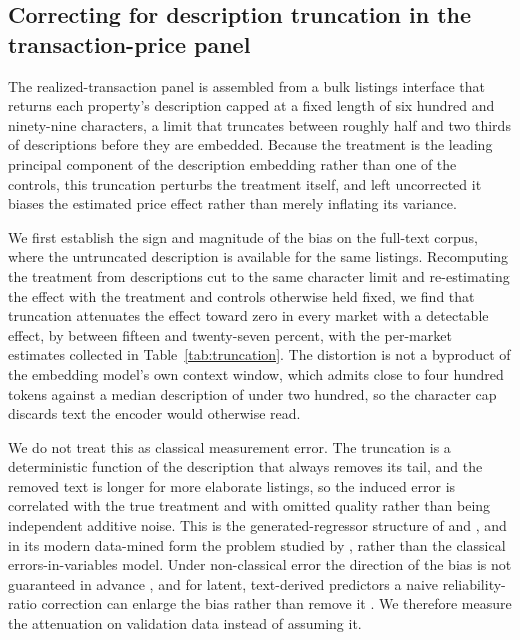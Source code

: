 \subsection{Correcting for description truncation in the transaction-price panel}
\label{sec:truncation}

The realized-transaction panel is assembled from a bulk listings interface that
returns each property's description capped at a fixed length of six hundred and
ninety-nine characters, a limit that truncates between roughly half and two thirds
of descriptions before they are embedded. Because the treatment is the leading
principal component of the description embedding rather than one of the controls,
this truncation perturbs the treatment itself, and left uncorrected it biases the
estimated price effect rather than merely inflating its variance.

We first establish the sign and magnitude of the bias on the full-text corpus,
where the untruncated description is available for the same listings. Recomputing
the treatment from descriptions cut to the same character limit and re-estimating
the effect with the treatment and controls otherwise held fixed, we find that
truncation attenuates the effect toward zero in every market with a detectable
effect, by between fifteen and twenty-seven percent, with the per-market estimates
collected in Table~\ref{tab:truncation}. The distortion is not a byproduct of the
embedding model's own context window, which admits close to four hundred tokens
against a median description of under two hundred, so the character cap discards
text the encoder would otherwise read.

We do not treat this as classical measurement error. The truncation is a
deterministic function of the description that always removes its tail, and the
removed text is longer for more elaborate listings, so the induced error is
correlated with the true treatment and with omitted quality rather than being
independent additive noise. This is the generated-regressor structure of
\citet{pagan1984econometric} and \citet{murphy1985twostep}, and in its modern
data-mined form the problem studied by \citet{yang2020datamined}, rather than the
classical errors-in-variables model. Under non-classical error the direction of the
bias is not guaranteed in advance \citep{bound2001measurement}, and for latent,
text-derived predictors a naive reliability-ratio correction can enlarge the bias
rather than remove it \citep{jerzak2025attenuation}. We therefore measure the
attenuation on validation data instead of assuming it.

